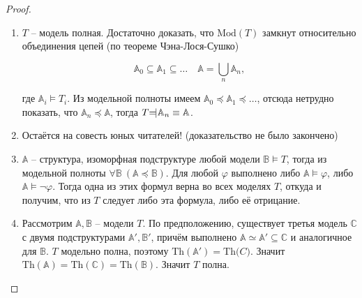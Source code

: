 \begin{proof} \

    \begin{enumerate}
        \item $T$ -- модель полная. Достаточно доказать, что $\text{Mod}(T)$ замкнут относительно объединения цепей (по теореме Чэна-Лося-Сушко)
         
        \[ 
            \mathbb{A}_0 \subseteq \mathbb{A}_1 \subseteq \ldots \quad \mathbb{A} = \bigcup_n \mathbb{A}_n,
        \]

        где $\mathbb{A}_i \models T_i$.
        Из модельной полноты имеем $\mathbb{A}_0 \preceq \mathbb{A}_1 \preceq \ldots$, отсюда нетрудно показать, что $\mathbb{A}_n \preceq \mathbb{A}$, тогда $T \text{\rotatebox[origin=c]{180}{$\models$}} \mathbb{A}_n \equiv \mathbb{A}$. 
        
        \item Остаётся на совесть юных читателей! (доказательство не было закончено)

        \item $\mathbb{A}$ -- структура, изоморфная подструктуре любой модели $\mathbb{B} \models T$, тогда из модельной полноты $\forall \mathbb{B}~(\mathbb{A} \preceq \mathbb{B})$. Для любой $\varphi$ выполнено либо $\mathbb{A} \models \varphi$, либо $\mathbb{A} \models \neg \varphi$. Тогда одна из этих формул верна во всех моделях $T$, откуда и получим, что из $T$ следует либо эта формула, либо её отрицание. 

        \item Рассмотрим $\mathbb{A}, \mathbb{B}$ -- модели $T$. По предположению, существует третья модель $\mathbb{C}$ с двумя подструктурами $\mathbb{A}', \mathbb{B}'$, причём выполнено $\mathbb{A}\simeq\mathbb{A}'\subseteq\mathbb{C}$ и аналогичное для $\mathbb{B}$. $T$ модельно полна, поэтому $\text{Th}(\mathbb{A}')=\text{Th}{\mathbb(C)}$. Значит $\text{Th}(\mathbb{A})=\text{Th}(\mathbb{C})=\text{Th}(\mathbb{B})$. Значит $T$ полна.
    \end{enumerate}
\end{proof}
